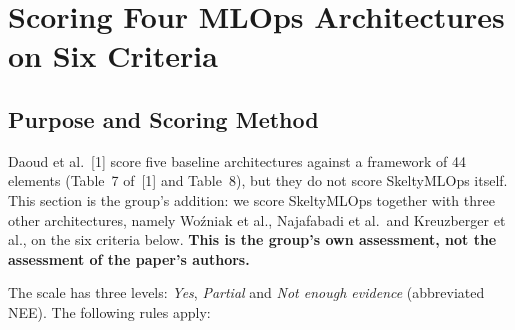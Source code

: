 
\providecommand{\ev}[1]{\textit{``#1''}}

\providecommand{\papercite}{[1]}
\providecommand{\paperTab}[1]{Table~#1 of~\papercite}

\section{Scoring Four MLOps Architectures on Six Criteria}
\label{sec:scoring}

\subsection{Purpose and Scoring Method}

Daoud et al.~\papercite{} score five baseline architectures against a framework of 44 elements (\paperTab{7} and Table~8), but they do not score SkeltyMLOps itself. This section is the group's addition: we score SkeltyMLOps together with three other architectures, namely Wo\'{z}niak et al., Najafabadi et al.\ and Kreuzberger et al., on the six criteria below. \textbf{This is the group's own assessment, not the assessment of the paper's authors.}

The scale has three levels: \emph{Yes}, \emph{Partial} and \emph{Not enough evidence} (abbreviated NEE). The following rules apply:


